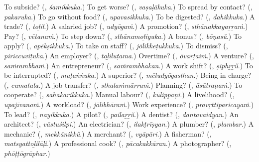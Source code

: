 \begin{tcolorbox}[breakable,colback=teal!4,colframe=teal!35!black,title={Before you move on}]
To subside? (\textbf{}, \emph{śamikkuka}.) To get worse? (\textbf{}, \emph{vaṣaḷākuka}.) To spread by contact? (\textbf{}, \emph{pakaruka}.) To go without food? (\textbf{}, \emph{upavasikkuka}.) To be digested? (\textbf{}, \emph{dahikkuka}.) A trade? (\textbf{}, \emph{toḻil}.) A salaried job? (\textbf{}, \emph{udyōgaṁ}.) A promotion? (\textbf{}, \emph{sthānakkayaṟṟaṁ}.) Pay? (\textbf{}, \emph{vētanaṁ}.) To step down? (\textbf{}, \emph{sthānamoḻiyuka}.) A bonus? (\textbf{}, \emph{bōṇasŭ}.) To apply? (\textbf{}, \emph{apēkṣikkuka}.) To take on staff? (\textbf{}, \emph{jōlikkeṭukkuka}.) To dismiss? (\textbf{}, \emph{piriccuviṭuka}.) An employer? (\textbf{}, \emph{toḻiluṭama}.) Overtime? (\textbf{}, \emph{ōvarṭaiṁ}.) A venture? (\textbf{}, \emph{saṁrambhaṁ}.) An entrepreneur? (\textbf{}, \emph{saṁrambhakan}.) A work shift? (\textbf{}, \emph{ṣiphṟṟŭ}.) To be interrupted? (\textbf{}, \emph{muṭaṅṅuka}.) A superior? (\textbf{}, \emph{mēludyōgasthan}.) Being in charge? (\textbf{}, \emph{cumatala}.) A job transfer? (\textbf{}, \emph{sthalaṁmāṟṟaṁ}.) Planning? (\textbf{}, \emph{āsūtraṇaṁ}.) To cooperate? (\textbf{}, \emph{sahakarikkuka}.) Manual labour? (\textbf{}, \emph{kūlippaṇi}.) A livelihood? (\textbf{}, \emph{upajīvanaṁ}.) A workload? (\textbf{}, \emph{jōlibhāraṁ}.) Work experience? (\textbf{}, \emph{pravṛttiparicayaṁ}.) To lead? (\textbf{}, \emph{nayikkuka}.) A pilot? (\textbf{}, \emph{pailaṟṟŭ}.) A dentist? (\textbf{}, \emph{dantavaidyan}.) An architect? (\textbf{}, \emph{vāstuśilpi}.) An electrician? (\textbf{}, \emph{ilakṭrīṣyan}.) A plumber? (\textbf{}, \emph{plambar}.) A mechanic? (\textbf{}, \emph{mekkānikkŭ}.) A merchant? (\textbf{}, \emph{vyāpāri}.) A fisherman? (\textbf{}, \emph{matsyattoḻilāḷi}.) A professional cook? (\textbf{}, \emph{pācakakkāran}.) A photographer? (\textbf{}, \emph{phōṭṭōgrāphar}.)
\end{tcolorbox}
